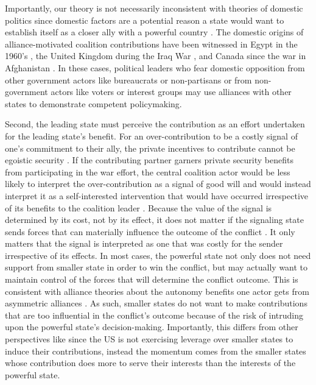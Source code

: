 \documentclass[12pt,letterpaper]{article}
\begin{document}
		Importantly, our theory is not necessarily inconsistent with theories of domestic politics since domestic factors are a potential reason a state would want to establish itself as a closer ally with a powerful country \citep{tago_whenaredemocratic_2009, pilster_aredemocraciesbetter_2011, wolford_nationalleaderspolitical_2016}. The domestic origins of alliance-motivated coalition contributions have been witnessed in Egypt in the 1960's \citep{barnett_domesticsourcesalliances_1991}, the United Kingdom during the Iraq War \citep{davidson_americaallieswar_2011}, and Canada since the war in Afghanistan \citep{massie_alliancevaluestatus_2018, mckay_whycanadabest_2018}. In these cases, political leaders who fear domestic opposition from other government actors like bureaucrats or non-partisans or from non-government actors like voters or interest groups may use alliances with other states to demonstrate competent policymaking.
		
		Second, the leading state must perceive the contribution as an effort undertaken for the leading state's benefit. For an over-contribution to be a costly signal of one's commitment to their ally, the private incentives to contribute cannot be egoistic security \citep{davidson_americaallieswar_2011}. If the contributing partner garners private security benefits from participating in the war effort, the central coalition actor would be less likely to interpret the over-contribution as a signal of good will and would instead interpret it as a self-interested intervention that would have occurred irrespective of its benefits to the coalition leader \citep{tago_whystatesjoin_2007, lake_hierarchyinternationalrelations_2009, chapman_securingapprovaldomestic_2011}. Because the value of the signal is determined by its cost, not by its effect, it does not matter if the signaling state sends forces that can materially influence the outcome of the conflict \citep{davidson_americaallieswar_2011}. It only matters that the signal is interpreted as one that was costly for the sender irrespective of its effects. In most cases, the powerful state not only does not need support from smaller state in order to win the conflict, but may actually want to maintain control of the forces that will determine the conflict outcome. This is consistent with alliance theories about the autonomy benefits one actor gets from asymmetric alliances \citep{morrow_alliancesasymmetryalternative_1991}. As such, smaller states do not want to make contributions that are too influential in the conflict's outcome because of the risk of intruding upon the powerful state's decision-making. Importantly, this differs from other perspectives like \citet[72-75]{bennett_burdensharingpersiangulf_1994} since the US is not exercising leverage over smaller states to induce their contributions, instead the momentum comes from the smaller states whose contribution does more to serve their interests than the interests of the powerful state.
\end{document}
